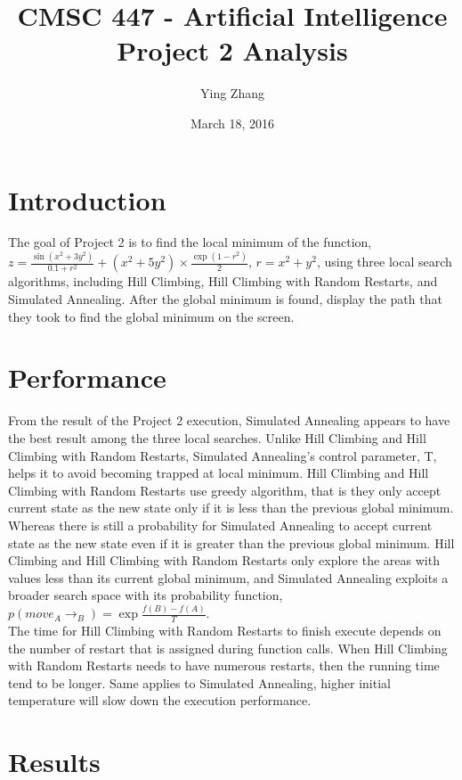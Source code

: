 \documentclass[a4paper]{article}
\title{CMSC 447 - Artificial Intelligence\\
Project 2 Analysis}
\author{Ying Zhang}
\date{March 18, 2016}
\begin{document}
\maketitle

\section{Introduction}

The goal of Project 2 is to find the local minimum of the function,\\
\(z=\frac{\sin(x^2+3y^2)}{0.1+r^2}+(x^2+5y^2)\times\frac{\exp(1-r^2)}{2}\), \(r=x^2+y^2\), using three local search algorithms, including Hill Climbing, Hill Climbing with Random Restarts, and Simulated Annealing. After the global minimum is found, display the path that they took to find the global minimum on the screen.

\section{Performance}

From the result of the Project 2 execution, Simulated Annealing appears to have the best result among the three local searches. Unlike Hill Climbing and Hill Climbing with Random Restarts, Simulated Annealing's control parameter, T, helps it to avoid becoming trapped at local minimum. Hill Climbing and Hill Climbing with Random Restarts use greedy algorithm, that is they only accept current state as the new state only if it is less than the previous global minimum. Whereas there is still a probability for Simulated Annealing to accept current state as the new state even if it is greater than the previous global minimum. Hill Climbing and Hill Climbing with Random Restarts only explore the areas with values less than its current global minimum, and Simulated Annealing exploits a broader search space with its probability function,\\ \(p(move_A\rightarrow _B) = \exp\frac{f(B)-f(A)}{T}\).\\

\noindent The time for Hill Climbing with Random Restarts to finish execute depends on the number of restart that is assigned during function calls. When Hill Climbing with Random Restarts needs to have numerous restarts, then the running time tend to be longer. Same applies to Simulated Annealing, higher initial temperature will slow down the execution performance.

\section{Results}
\end{document}
